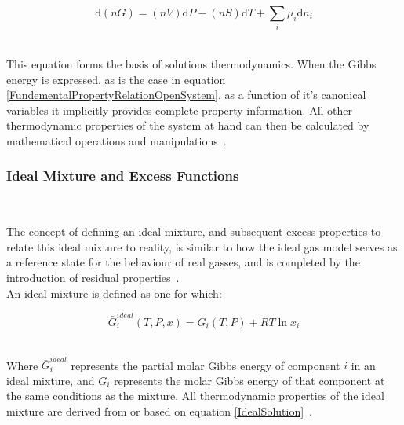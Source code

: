 \begin{equation}
\mathrm{d}\left(nG\right) = \left(nV\right)\mathrm{d}P - \left(nS\right)\mathrm{d}T + \sum_{i}\mu_{i}\mathrm{d} n_{i} \label{FundementalPropertyRelationOpenSystem}
\end{equation}\

This equation forms the basis of solutions thermodynamics. When the Gibbs energy is expressed, as is the case in equation \ref{FundementalPropertyRelationOpenSystem}, as a function of it's canonical variables it implicitly provides complete property information. All other thermodynamic properties of the system at hand can then be calculated by mathematical operations and manipulations~\cite{SmithNessAbbott, MolecularThermodynamicsOfFluidPhaseEquilibria}.

\subsubsection{Ideal Mixture and Excess Functions} \label{IdealExcessPropertiesSection}\

The concept of defining an ideal mixture, and subsequent excess properties to relate this ideal mixture to reality, is similar to how the ideal gas model serves as a reference state for the behaviour of real gasses, and is completed by the introduction of residual properties~\cite{MolecularThermodynamicsOfFluidPhaseEquilibria, SmithNessAbbott}.\\

An ideal mixture is defined as one for which:\

\begin{equation}
\bar{G}_{i}^{ideal} \left(T, P, x\right)= G_{i}\left(T, P\right) + RT \ln x_{i} \label{IdealSolution}
\end{equation}\



Where $\bar{G}_{i}^{ideal}$ represents the partial molar Gibbs energy of component $i$ in an ideal mixture, and $G_{i}$ represents the molar Gibbs energy of that component at the same conditions as the mixture. All thermodynamic properties of the ideal mixture are derived from or based on equation \ref{IdealSolution}~\cite{MolecularThermodynamicsOfFluidPhaseEquilibria, SmithNessAbbott}.\\


